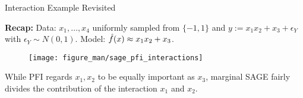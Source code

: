 \documentclass[11pt,compress,t,notes=noshow, aspectratio=169, xcolor=table]{beamer}
\begin{document}
\begin{vbframe}{Interaction Example Revisited}

\textbf{Recap:} Data: $x_1, \dots, x_4$ uniformly sampled from $\{-1, 1\}$ and $y:= x_1 x_2 + x_3 + \epsilon_Y$ with $\epsilon_Y \sim N(0, 1)$. Model: $\hat{f}(x) \approx x_1 x_2 + x_3$.\\
%
\begin{figure}
  \texttt{[image: figure\_man/sage\_pfi\_interactions]}
\end{figure}
%
While PFI regards $x_1, x_2$ to be equally important as $x_3$, marginal SAGE fairly divides the contribution of the interaction $x_1$ and $x_2$.
  
\end{vbframe}


%
%
%
%
%
%
%


\begin{vbframe}
  \printbibliography
\end{vbframe}

\endlecture
\end{document}
